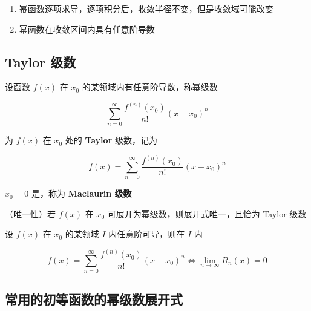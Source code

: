 \documentclass[lang = zh , final , oneside , openany , titlepage , zihao = -4 , linespread = 1.3 , baselineskip = false , cjk-font = windows , text-font = newtx , math-font = newtx , math-style = ISO , uppercase-greek = upright , integral-limits = false]{sjtureport}
\begin{document}
\begin{remark}
    \begin{enumerate}
\item
  幂函数逐项求导，逐项积分后，收敛半径不变，但是收敛域可能改变
\item
  幂函数在收敛区间内具有任意阶导数
\end{enumerate}
\end{remark}

\subsection{Taylor 级数}

\begin{definition}
    设函数 \(f(x)\) 在 \(x_0\) 的某领域内有任意阶导数，称幂级数

\[\sum_{n=0}^\infty \frac{f^{(n)}(x_0)}{n!}(x-x_0)^n\]

为 \(f(x)\) 在 \(x_0\) 处的 \textbf{Taylor} 级数，记为

\[f(x) = \sum_{n=0}^\infty \frac{f^{(n)}(x_0)}{n!}(x-x_0)^n\]

\(x_0=0\) 是，称为 \textbf{Maclaurin 级数}
\end{definition}

\begin{theorem}
    （唯一性）若 \(f(x)\) 在 \(x_0\) 可展开为幂级数，则展开式唯一，且恰为 Taylor 级数
\end{theorem}

\begin{theorem}
    设 \(f(x)\) 在 \(x_0\) 的某领域 \(I\) 内任意阶可导，则在 \(I\) 内

\[f(x) = \sum_{n=0}^\infty \frac{f^{(n)}(x_0)}{n!}(x-x_0)^n \Leftrightarrow \lim_{n\to\infty}R_n(x) =0\]
\end{theorem}

\subsection{常用的初等函数的幂级数展开式}
\end{document}
